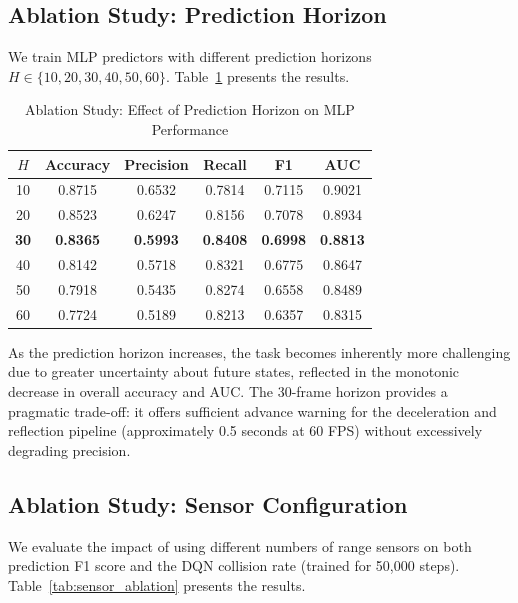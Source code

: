 \documentclass[conference]{IEEEtran}
\begin{document}
\subsection{Ablation Study: Prediction Horizon}

We train MLP predictors with different prediction horizons $H \in \{10, 20, 30, 40, 50, 60\}$. Table~\ref{tab:horizon_ablation} presents the results.

\begin{table}[H]
\centering
\caption{Ablation Study: Effect of Prediction Horizon on MLP Performance}
\label{tab:horizon_ablation}
\begin{tabular}{@{}cccccc@{}}
\toprule
\textbf{$H$} & \textbf{Accuracy} & \textbf{Precision} & \textbf{Recall} & \textbf{F1} & \textbf{AUC} \\
\midrule
10 & 0.8715 & 0.6532 & 0.7814 & 0.7115 & 0.9021 \\
20 & 0.8523 & 0.6247 & 0.8156 & 0.7078 & 0.8934 \\
\textbf{30} & \textbf{0.8365} & \textbf{0.5993} & \textbf{0.8408} & \textbf{0.6998} & \textbf{0.8813} \\
40 & 0.8142 & 0.5718 & 0.8321 & 0.6775 & 0.8647 \\
50 & 0.7918 & 0.5435 & 0.8274 & 0.6558 & 0.8489 \\
60 & 0.7724 & 0.5189 & 0.8213 & 0.6357 & 0.8315 \\
\bottomrule
\end{tabular}
\end{table}

As the prediction horizon increases, the task becomes inherently more challenging due to greater uncertainty about future states, reflected in the monotonic decrease in overall accuracy and AUC. The 30-frame horizon provides a pragmatic trade-off: it offers sufficient advance warning for the deceleration and reflection pipeline (approximately 0.5 seconds at 60 FPS) without excessively degrading precision.

\subsection{Ablation Study: Sensor Configuration}

We evaluate the impact of using different numbers of range sensors on both prediction F1 score and the DQN collision rate (trained for 50,000 steps). Table~\ref{tab:sensor_ablation} presents the results.
\end{document}
